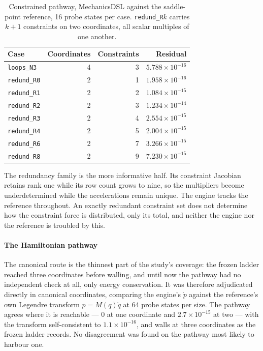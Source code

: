 \documentclass[review,12pt]{elsarticle}
\begin{document}
\begin{table}[!htbp]
\centering
\caption{Constrained pathway, MechanicsDSL against the saddle-point reference,
16 probe states per case. \texttt{redund\_R$k$} carries $k+1$ constraints on two
coordinates, all scalar multiples of one another.}
\label{tab:constrained}
\begin{tabular}{@{}lrrr@{}}
\toprule
\textbf{Case} & \textbf{Coordinates} & \textbf{Constraints} & \textbf{Residual} \\
\midrule
\texttt{loops\_N3}  & 4 & 3 & $5.788\times10^{-16}$ \\
\texttt{redund\_R0} & 2 & 1 & $1.958\times10^{-16}$ \\
\texttt{redund\_R1} & 2 & 2 & $1.084\times10^{-15}$ \\
\texttt{redund\_R2} & 2 & 3 & $1.234\times10^{-14}$ \\
\texttt{redund\_R3} & 2 & 4 & $2.554\times10^{-15}$ \\
\texttt{redund\_R4} & 2 & 5 & $2.004\times10^{-15}$ \\
\texttt{redund\_R6} & 2 & 7 & $3.266\times10^{-15}$ \\
\texttt{redund\_R8} & 2 & 9 & $7.230\times10^{-15}$ \\
\bottomrule
\end{tabular}
\end{table}

The redundancy family is the more informative half. Its constraint Jacobian
retains rank one while its row count grows to nine, so the multipliers become
underdetermined while the accelerations remain unique. The engine tracks the
reference throughout. An exactly redundant constraint set does not determine how
the constraint force is distributed, only its total, and neither the engine nor
the reference is troubled by this.

\paragraph{The Hamiltonian pathway}
The canonical route is the thinnest part of the study's coverage: the frozen
ladder reached three coordinates before walling, and until now the pathway had
no independent check at all, only energy conservation. It was therefore
adjudicated directly in canonical coordinates, comparing the engine's $\dot p$
against the reference's own Legendre transform $p = M(q)\dot q$ at 64 probe states
per size. The pathway agrees where it is reachable --- $0$ at one coordinate and
$2.7\times10^{-15}$ at two --- with the transform self-consistent to
$1.1\times10^{-16}$, and walls at three coordinates as the frozen ladder records.
No disagreement was found on the pathway most likely to harbour one.
\end{document}
